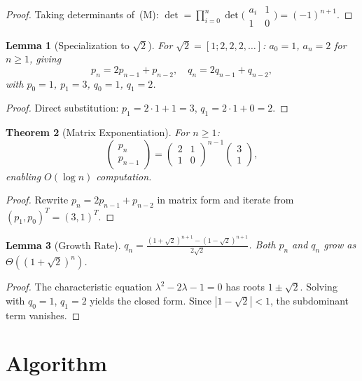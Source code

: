 \documentclass[11pt]{article}
\newtheorem{theorem}{Theorem}
\newtheorem{lemma}[theorem]{Lemma}
\theoremstyle{definition}
\begin{document}
\begin{proof}
Taking determinants of~(M): $\det = \prod_{i=0}^n \det\bigl(\begin{smallmatrix} a_i & 1 \\ 1 & 0 \end{smallmatrix}\bigr) = (-1)^{n+1}$.
\end{proof}

\begin{lemma}[Specialization to $\sqrt{2}$]
For $\sqrt{2} = [1;2,2,2,\ldots]$: $a_0=1$, $a_n=2$ for $n \geq 1$, giving
\[
p_n = 2p_{n-1}+p_{n-2},\quad q_n = 2q_{n-1}+q_{n-2},
\]
with $p_0=1$, $p_1=3$, $q_0=1$, $q_1=2$.
\end{lemma}

\begin{proof}
Direct substitution: $p_1 = 2\cdot 1 + 1 = 3$, $q_1 = 2\cdot 1 + 0 = 2$.
\end{proof}

\begin{theorem}[Matrix Exponentiation]
For $n \geq 1$:
\[
\begin{pmatrix} p_n \\ p_{n-1}\end{pmatrix} = \begin{pmatrix} 2 & 1 \\ 1 & 0\end{pmatrix}^{n-1}\begin{pmatrix} 3 \\ 1\end{pmatrix},
\]
enabling $O(\log n)$ computation.
\end{theorem}

\begin{proof}
Rewrite $p_n = 2p_{n-1}+p_{n-2}$ in matrix form and iterate from $(p_1,p_0)^T = (3,1)^T$.
\end{proof}

\begin{lemma}[Growth Rate]
$q_n = \frac{(1+\sqrt{2})^{n+1} - (1-\sqrt{2})^{n+1}}{2\sqrt{2}}$. Both $p_n$ and $q_n$ grow as $\Theta\!\left((1+\sqrt{2})^n\right)$.
\end{lemma}

\begin{proof}
The characteristic equation $\lambda^2 - 2\lambda - 1 = 0$ has roots $1 \pm \sqrt{2}$. Solving with $q_0=1$, $q_1=2$ yields the closed form. Since $|1-\sqrt{2}|<1$, the subdominant term vanishes.
\end{proof}

\section{Algorithm}
\end{document}

